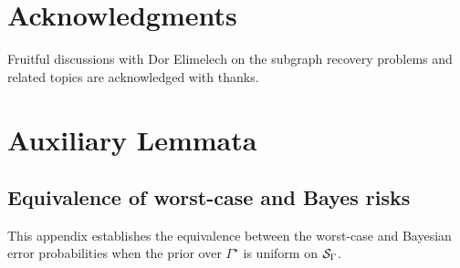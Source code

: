 \documentclass[12pt]{article}
\newcommand{\calS}{{\cal S}}
\begin{document}
\section*{Acknowledgments}
Fruitful discussions with Dor Elimelech on the subgraph recovery problems and related topics are acknowledged with thanks.



\appendix

\section{Auxiliary Lemmata}\label{app:lemmata}

\subsection{Equivalence of worst-case and Bayes risks}\label{app:EquivBayesWorst}
This appendix establishes the equivalence between the worst-case and Bayesian error probabilities when the prior over $\Gamma^\star$ is uniform on $\calS_\Gamma$.
\end{document}
